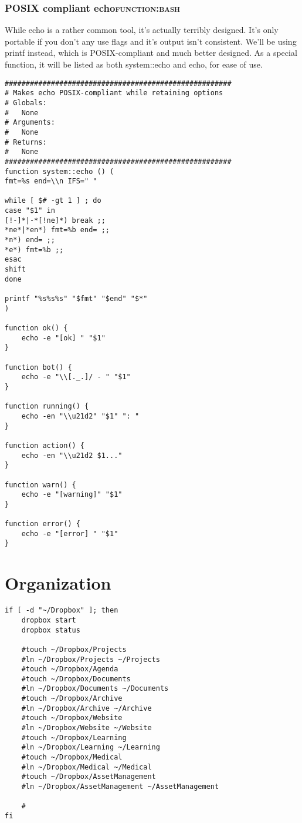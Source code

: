 \documentclass[11pt]{article}
\begin{document}
\subsubsection{POSIX compliant echo\hfill{}\textsc{function:bash}}
\label{sec:orgd6e49a8}

While echo is a rather common tool, it's actually terribly designed. It's only portable if you don't any use flags and it's output isn't consistent. 
We'll be using printf instead, which is POSIX-compliant and much better designed. As a special function, it will be listed as both system::echo and echo, for ease of use.
\begin{verbatim}
######################################################
# Makes echo POSIX-compliant while retaining options
# Globals:
#   None
# Arguments:
#   None
# Returns:
#   None
######################################################
function system::echo () (
fmt=%s end=\\n IFS=" "

while [ $# -gt 1 ] ; do
case "$1" in
[!-]*|-*[!ne]*) break ;;
*ne*|*en*) fmt=%b end= ;;
*n*) end= ;;
*e*) fmt=%b ;;
esac
shift
done

printf "%s%s%s" "$fmt" "$end" "$*"
)

function ok() {
    echo -e "[ok] " "$1"
}

function bot() {
    echo -e "\\[._.]/ - " "$1"
}

function running() {
    echo -en "\\u21d2" "$1" ": "
}

function action() {
    echo -en "\\u21d2 $1..."
}

function warn() {
    echo -e "[warning]" "$1"
}

function error() {
    echo -e "[error] " "$1"
}
\end{verbatim}
\section{Organization}
\label{sec:org8ffae52}
\begin{verbatim}
if [ -d "~/Dropbox" ]; then
    dropbox start
    dropbox status

    #touch ~/Dropbox/Projects
    #ln ~/Dropbox/Projects ~/Projects
    #touch ~/Dropbox/Agenda
    #touch ~/Dropbox/Documents
    #ln ~/Dropbox/Documents ~/Documents
    #touch ~/Dropbox/Archive
    #ln ~/Dropbox/Archive ~/Archive
    #touch ~/Dropbox/Website
    #ln ~/Dropbox/Website ~/Website
    #touch ~/Dropbox/Learning
    #ln ~/Dropbox/Learning ~/Learning
    #touch ~/Dropbox/Medical
    #ln ~/Dropbox/Medical ~/Medical
    #touch ~/Dropbox/AssetManagement
    #ln ~/Dropbox/AssetManagement ~/AssetManagement

    #
fi
\end{verbatim}
\end{document}
